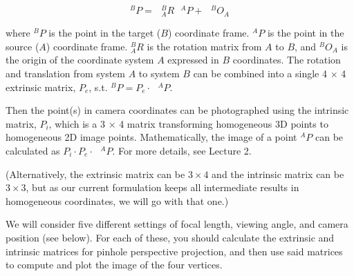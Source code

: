 \documentclass[11pt]{article}
\begin{document}
\[^BP = \text{ } ^B_AR\text{ }^AP + \text{ } ^BO_A\]

where \(^BP\) is the point in the target (\(B\)) coordinate frame.
\(^AP\) is the point in the source (\(A\)) coordinate frame. \(^B_AR\)
is the rotation matrix from \(A\) to \(B\), and \(^BO_A\) is the origin
of the coordinate system \(A\) expressed in \(B\) coordinates. The
rotation and translation from system \(A\) to system \(B\) can be
combined into a single 4 \(\times\) 4 extrinsic matrix, \(P_e\), s.t.
\(^BP = P_e \cdot \text{ }^AP\).

Then the point(s) in camera coordinates can be photographed using the
intrinsic matrix, \(P_i\), which is a 3 \(\times\) 4 matrix transforming
homogeneous 3D points to homogeneous 2D image points. Mathematically,
the image of a point \(^AP\) can be calculated as
\(P_i \cdot P_e \cdot \text{ }^AP\). For more details, see Lecture 2.

(Alternatively, the extrinsic matrix can be \(3 \times 4\) and the
intrinsic matrix can be \(3 \times 3\), but as our current formulation
keeps all intermediate results in homogeneous coordinates, we will go
with that one.)

We will consider five different settings of focal length, viewing angle,
and camera position (see below). For each of these, you should calculate
the extrinsic and intrinsic matrices for pinhole perspective projection,
and then use said matrices to compute and plot the image of the four
vertices.
\end{document}
